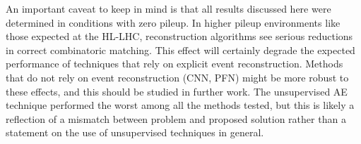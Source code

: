 An important caveat to keep in mind is that all results discussed here were determined in conditions with zero pileup. In higher pileup environments like those expected at the HL-LHC, reconstruction algorithms see serious reductions in correct combinatoric matching. This effect will certainly degrade the expected performance of techniques that rely on explicit event reconstruction. Methods that do not rely on event reconstruction (CNN, PFN) might be more robust to these effects, and this should be studied in further work. The unsupervised AE technique performed the worst among all the methods tested, but this is likely a reflection of a mismatch between problem and proposed solution rather than a statement on the use of unsupervised techniques in general. 

